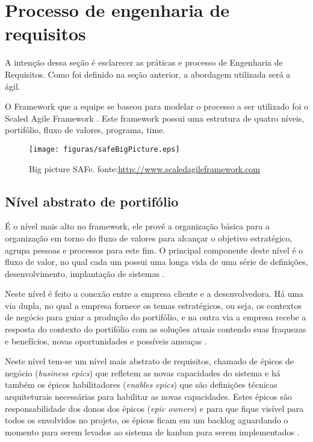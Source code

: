 \section{Processo de engenharia de requisitos}

A intenção dessa seção é esclarecer as práticas e processo de Engenharia de Requisitos. Como foi definido na seção anterior, a abordagem utilizada será a ágil.

O Framework que a equipe se baseou para modelar o processo a ser utilizado foi o Scaled Agile Framework \cite{safe}. Este framework possui uma estrutura de quatro níveis, portifólio, fluxo de valores, programa, time.

\begin{figure}[H]
    \centering
    \label{safeBigPicture}
    \texttt{[image: figuras/safeBigPicture.eps]}
    \caption{Big picture SAFe. fonte:\url{http://www.scaledagileframework.com}}
\end{figure}

\subsection{Nível abstrato de portifólio}

É o nível mais alto no framework, ele provê a organização básica para a organização em torno do fluxo de valores para alcançar o objetivo estratégico, agrupa pessoas e processos para este fim. O principal componente deste nível é o fluxo de valor, no qual cada um possui uma longa vida de uma série de definições, desenvolvimento, implantação de sistemas \cite{safe}.

Neste nível é feito a conexão entre a empresa cliente e a desenvolvedora. Há uma via dupla, no qual a empresa fornece os temas estratégicos, ou seja, os contextos de negócio para guiar a produção do portifólio, e na outra via a empresa recebe a resposta do contexto do portifólio com as soluções atuais contendo suas fraquezas e benefícios, novas oportunidades e possíveis ameaças \cite{safe}.

Neste nível tem-se um nível mais abstrato de requisitos, chamado de épicos de negócio (\textit{business epics}) que refletem as novas capacidades do sistema e há também os épicos habilitadores (\textit{enables epics}) que são definições técnicas arquiteturais necessárias para habilitar as novas capacidades. Estes épicos são responsabilidade dos donos dos épicos (\textit{epic owners}) e para que fique visível para todos os envolvidos no projeto, os épicos ficam em um backlog aguardando o momento para serem levados ao sistema de kanban para serem implementados \cite{safe}.

